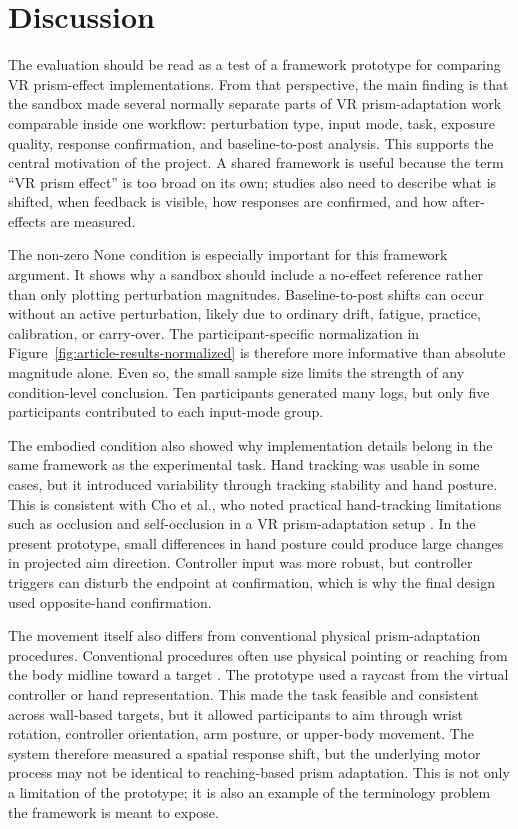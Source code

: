 \section*{Discussion}

The evaluation should be read as a test of a framework prototype for comparing VR prism-effect implementations. From that perspective, the main finding is that the sandbox made several normally separate parts of VR prism-adaptation work comparable inside one workflow: perturbation type, input mode, task, exposure quality, response confirmation, and baseline-to-post analysis. This supports the central motivation of the project. A shared framework is useful because the term ``VR prism effect'' is too broad on its own; studies also need to describe what is shifted, when feedback is visible, how responses are confirmed, and how after-effects are measured.

The non-zero None condition is especially important for this framework argument. It shows why a sandbox should include a no-effect reference rather than only plotting perturbation magnitudes. Baseline-to-post shifts can occur without an active perturbation, likely due to ordinary drift, fatigue, practice, calibration, or carry-over. The participant-specific normalization in Figure~\ref{fig:article-results-normalized} is therefore more informative than absolute magnitude alone. Even so, the small sample size limits the strength of any condition-level conclusion. Ten participants generated many logs, but only five participants contributed to each input-mode group.

The embodied condition also showed why implementation details belong in the same framework as the experimental task. Hand tracking was usable in some cases, but it introduced variability through tracking stability and hand posture. This is consistent with Cho et al., who noted practical hand-tracking limitations such as occlusion and self-occlusion in a VR prism-adaptation setup \cite{cho2022feasibility}. In the present prototype, small differences in hand posture could produce large changes in projected aim direction. Controller input was more robust, but controller triggers can disturb the endpoint at confirmation, which is why the final design used opposite-hand confirmation.

The movement itself also differs from conventional physical prism-adaptation procedures. Conventional procedures often use physical pointing or reaching from the body midline toward a target \cite{serino2006mechanisms,Serino2011}. The prototype used a raycast from the virtual controller or hand representation. This made the task feasible and consistent across wall-based targets, but it allowed participants to aim through wrist rotation, controller orientation, arm posture, or upper-body movement. The system therefore measured a spatial response shift, but the underlying motor process may not be identical to reaching-based prism adaptation. This is not only a limitation of the prototype; it is also an example of the terminology problem the framework is meant to expose.

